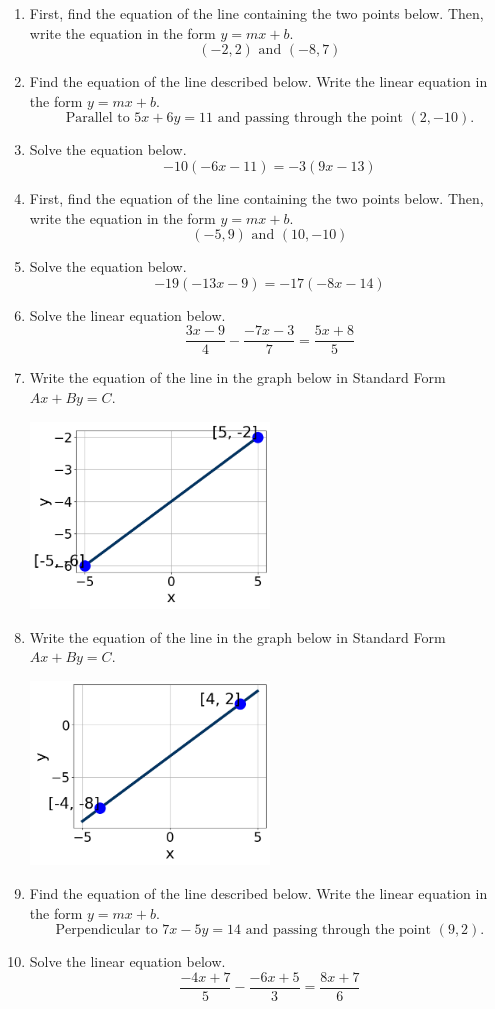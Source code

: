 \documentclass[14pt]{extbook}
\begin{document}
\begin{enumerate}
\item{
First, find the equation of the line containing the two points below. Then, write the equation in the form $ y=mx+b $.\[ (-2, 2) \text{ and } (-8, 7) \]} \newpage
\item{
Find the equation of the line described below. Write the linear equation in the form $y=mx+b$.\[ \text{Parallel to } 5 x + 6 y = 11 \text{ and passing through the point } (2, -10). \]} \newpage
\item{
Solve the equation below.\[ -10(-6x -11) = -3(9x -13) \]} \newpage
\item{
First, find the equation of the line containing the two points below. Then, write the equation in the form $ y=mx+b $.\[ (-5, 9) \text{ and } (10, -10) \]} \newpage
\item{
Solve the equation below.\[ -19(-13x -9) = -17(-8x -14) \]} \newpage
\item{
Solve the linear equation below.\[ \frac{3x -9}{4} - \frac{-7x -3}{7} = \frac{5x + 8}{5} \]} \newpage
\item{
Write the equation of the line in the graph below in Standard Form $Ax+By=C$.
\begin{center}
    \includegraphics[width=0.5\textwidth]{../Figures/linearGraphToStandardB.png}
\end{center}
} \newpage
\item{
Write the equation of the line in the graph below in Standard Form $Ax+By=C$.
\begin{center}
    \includegraphics[width=0.5\textwidth]{../Figures/linearGraphToStandardCopyB.png}
\end{center}
} \newpage
\item{
Find the equation of the line described below. Write the linear equation in the form $y=mx+b$.\[ \text{Perpendicular to } 7 x - 5 y = 14 \text{ and passing through the point } (9, 2). \]} \newpage
\item{
Solve the linear equation below.\[ \frac{-4x + 7}{5} - \frac{-6x + 5}{3} = \frac{8x + 7}{6} \]} \newpage
\end{enumerate}
\end{document}
